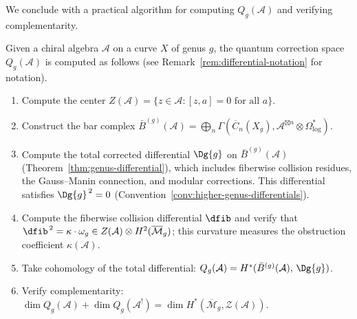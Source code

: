 We conclude with a practical algorithm for computing $Q_g(\mathcal{A})$ and verifying 
complementarity.

\begin{remark}\label{alg:quantum-corrections}
Given a chiral algebra $\mathcal{A}$ on a curve $X$ of genus $g$, the quantum correction space $Q_g(\mathcal{A})$ is computed as follows
(see Remark~\ref{rem:differential-notation} for notation).
\begin{enumerate}
\item Compute the center $Z(\mathcal{A}) = \{z \in \mathcal{A} : [z, a] = 0 \text{ for all } a\}$.
\item Construct the bar complex $\bar{B}^{(g)}(\mathcal{A}) = \bigoplus_n \Gamma(\overline{C}_n(X_g), \mathcal{A}^{\boxtimes n} \otimes \Omega^*_{\log})$.
\item Compute the total corrected differential $\Dg{g}$ on $\bar{B}^{(g)}(\mathcal{A})$
(Theorem~\ref{thm:genus-differential}), which includes fiberwise collision
residues, the Gauss--Manin connection, and modular corrections.
This differential satisfies $\Dg{g}^{\,2} = 0$ (Convention~\ref{conv:higher-genus-differentials}).
\item Compute the fiberwise collision differential $\dfib$ and verify
that $\dfib^{\,2} = \kappa \cdot \omega_g \in Z(\mathcal{A}) \otimes H^2(\overline{\mathcal{M}}_g)$;
this curvature measures the obstruction coefficient $\kappa(\mathcal{A})$.
\item Take cohomology of the total differential:
$Q_g(\mathcal{A}) = H^*(\bar{B}^{(g)}(\mathcal{A}),\, \Dg{g})$.
\item Verify complementarity: $\dim Q_g(\mathcal{A}) + \dim Q_g(\mathcal{A}^!) = \dim H^*(\overline{\mathcal{M}}_g, \mathcal{Z}(\mathcal{A}))$.
\end{enumerate}
\end{remark}


